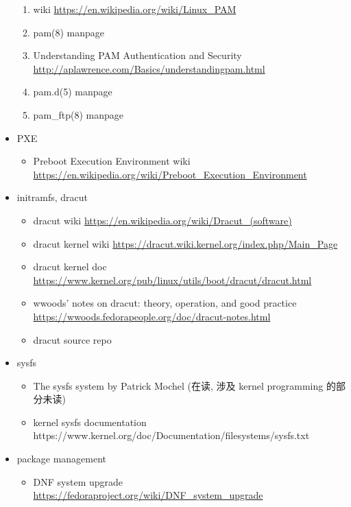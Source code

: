 \documentclass{article}
\begin{document}
\begin{itemize}
\begin{enumerate}
            \item wiki \url{https://en.wikipedia.org/wiki/Linux_PAM}
            \item pam(8) manpage
            \item Understanding PAM Authentication and Security \url{http://aplawrence.com/Basics/understandingpam.html}
            \item pam.d(5) manpage
            \item pam_ftp(8) manpage
        \end{enumerate}
    \item PXE
        \begin{itemize}
            \item Preboot Execution Environment wiki \url{https://en.wikipedia.org/wiki/Preboot_Execution_Environment}
        \end{itemize}
    \item initramfs, dracut
        \begin{itemize}
            \item dracut wiki \url{https://en.wikipedia.org/wiki/Dracut_(software)}
            \item dracut kernel wiki \url{https://dracut.wiki.kernel.org/index.php/Main_Page}
            \item dracut kernel doc \url{https://www.kernel.org/pub/linux/utils/boot/dracut/dracut.html}
            \item wwoods' notes on dracut: theory, operation, and good practice \url{https://wwoods.fedorapeople.org/doc/dracut-notes.html}
            \item dracut source repo
        \end{itemize}
    \item sysfs
        \begin{itemize}
            \item The sysfs system by Patrick Mochel (在读, 涉及 kernel programming 的部分未读)
            \item kernel sysfs documentation https://www.kernel.org/doc/Documentation/filesystems/sysfs.txt
        \end{itemize}
    \item package management
        \begin{itemize}
            \item DNF system upgrade \url{https://fedoraproject.org/wiki/DNF_system_upgrade}
        \end{itemize}
\end{itemize}
%
\end{document}
